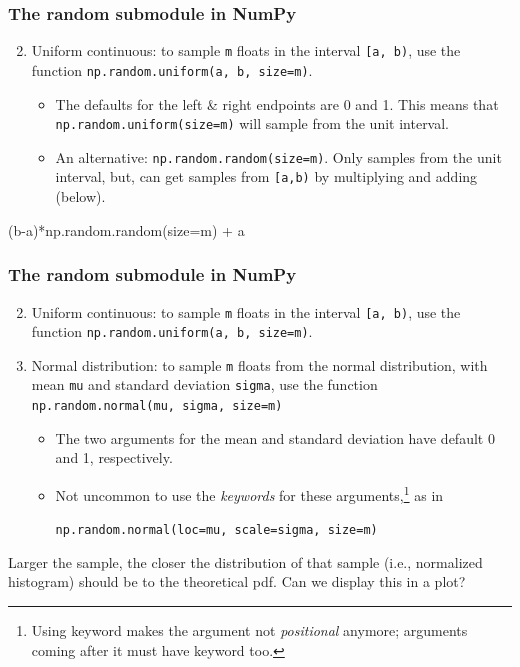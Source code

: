 \documentclass{beamer}
\newenvironment{codeblock}
    {\hfill\begin{beamerboxesrounded}[lower=codecol, width=0.8\textwidth]
    \medskip

    }
    { 
    \end{beamerboxesrounded}\hfill
    }
\theoremstyle{example}
\newcommand{\ttt}[1]{{\small\texttt{#1}}}
\begin{document}
\begin{frame}[fragile]
\frametitle{The {\ttm random} submodule in NumPy}

\begin{enumerate}
    \setcounter{enumi}{1}
    \item Uniform continuous: to sample \ttt{m} floats in the interval \ttt{[a, b)}, use the function \ttt{np.random.uniform(a, b, size=m)}.
    \begin{itemize}
        \pause
        \item The defaults for the left \& right endpoints are 0 and 1. This means that \ttt{np.random.uniform(size=m)} will sample from the unit interval.
        \item An alternative: \ttt{np.random.random(size=m)}. Only samples from the unit interval, but, can get samples from \ttt{[a,b)} by multiplying and adding (below).
    \end{itemize}
\end{enumerate}

\vspace*{12pt}
\pause
\begin{codeblock}

\begin{python}[numbers=none]
(b-a)*np.random.random(size=m) + a
\end{python}

\end{codeblock}

\end{frame}

\begin{frame}[fragile]
    \frametitle{The {\ttm random} submodule in NumPy}
    
    \begin{enumerate}
        \setcounter{enumi}{1}
        \item Uniform continuous: to sample \ttt{m} floats in the interval \ttt{[a, b)}, use the function \ttt{np.random.uniform(a, b, size=m)}.
        \item Normal distribution: to sample \ttt{m} floats from the normal distribution, with mean \ttt{mu} and standard deviation \ttt{sigma}, use the function \ttt{np.random.normal(mu, sigma, size=m)}
        \begin{itemize}
            \pause
            \item The two arguments for the mean and standard deviation have default 0 and 1, respectively.
            \item Not uncommon to use the \emph{keywords} for these arguments,\footnote{Using keyword makes the argument not \emph{positional} anymore; arguments coming after it must have keyword too.} as in 
            \begin{center}\ttt{np.random.normal(loc=mu, scale=sigma, size=m)}\end{center}
        \end{itemize}
    \end{enumerate}

    \pause
    Larger the sample, the closer the distribution of that sample (i.e., normalized histogram) should be to the theoretical pdf. Can we display this in a plot?
\end{frame}
    
\end{document}
